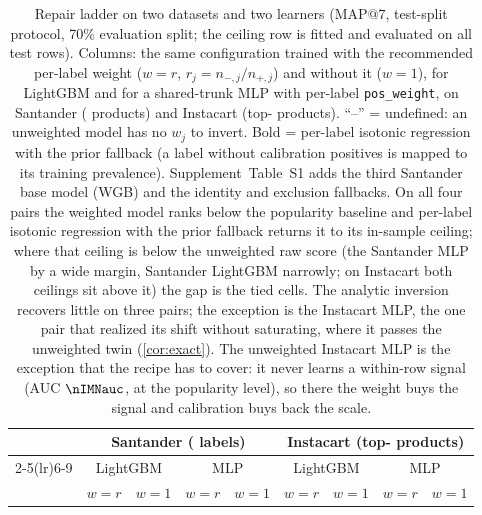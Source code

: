 \documentclass[sigconf,nonacm]{acmart}
\makeatletter
\newcommand{\mapseven}{\mathrm{MAP}@7\xspace}
\newcommand{\Supp}[1]{Supplement~#1}  %
\makeatother
\begin{document}
\begin{table}[t]
\caption{Repair ladder on two datasets and two learners ($\mapseven$, test-split protocol, 70\% evaluation split; the ceiling row is fitted and evaluated on all test rows). Columns: the same configuration trained with the recommended per-label weight ($w{=}r$, $r_j=n_{-,j}/n_{+,j}$) and without it ($w{=}1$), for LightGBM and for a shared-trunk MLP with per-label \texttt{pos\_weight}, on Santander (\nnLabels{} products) and Instacart (top-\nInLabels{} products). ``--'' = undefined: an unweighted model has no $w_j$ to invert. Bold = per-label isotonic regression with the prior fallback (a label without calibration positives is mapped to its training prevalence). \Supp{Table~S1} adds the third Santander base model (WGB) and the identity and exclusion fallbacks. On all four pairs the weighted model ranks below the popularity baseline and per-label isotonic regression with the prior fallback returns it to its in-sample ceiling; where that ceiling is below the unweighted raw score (the Santander MLP by a wide margin, Santander LightGBM narrowly; on Instacart both ceilings sit above it) the gap is the tied cells. The analytic inversion recovers little on three pairs; the exception is the Instacart MLP, the one pair that realized its shift without saturating, where it passes the unweighted twin (\cref{cor:exact}). The unweighted Instacart MLP is the exception that the recipe has to cover: it never learns a within-row signal (AUC $\nIMNauc$, at the popularity level), so there the weight buys the signal and calibration buys back the scale.}
\label{tab:ladder}
\footnotesize
\setlength{\tabcolsep}{4pt}
\begin{tabular}{@{}lcccccccc@{}}
\toprule
 & \multicolumn{4}{c}{Santander (\nnLabels{} labels)} & \multicolumn{4}{c}{Instacart (top-\nInLabels{} products)} \\
\cmidrule(lr){2-5}\cmidrule(lr){6-9}
 & \multicolumn{2}{c}{LightGBM} & \multicolumn{2}{c}{MLP} & \multicolumn{2}{c}{LightGBM} & \multicolumn{2}{c}{MLP} \\
 & $w{=}r$ & $w{=}1$ & $w{=}r$ & $w{=}1$ & $w{=}r$ & $w{=}1$ & $w{=}r$ & $w{=}1$ \\
\midrule

\bottomrule
\end{tabular}
\end{table}
\end{document}
